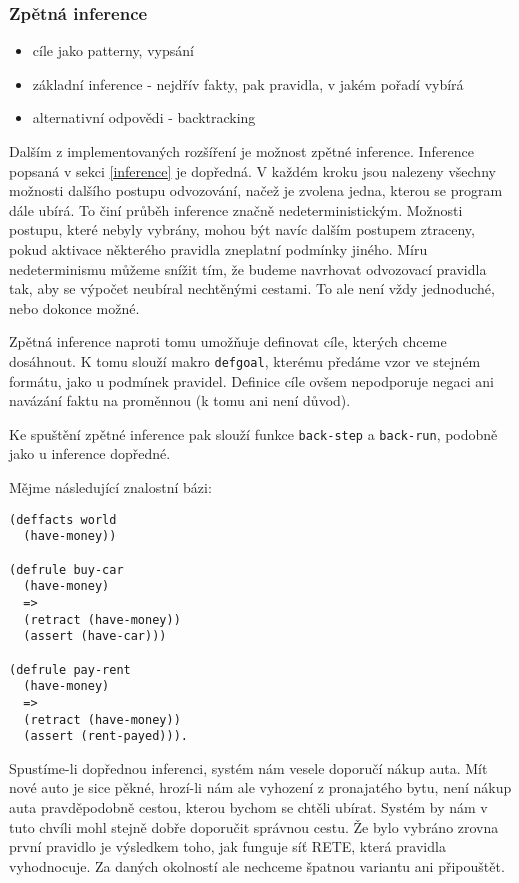 \subsubsection{Zpětná inference}
\begin{framed}
  \begin{itemize}
    \item cíle jako patterny, vypsání
    \item základní inference - nejdřív fakty, pak pravidla, v jakém pořadí
      vybírá
    \item alternativní odpovědi - backtracking
  \end{itemize}
\end{framed}

Dalším z implementovaných rozšíření je možnost zpětné inference. Inference
popsaná v sekci \ref{inference} je dopředná. V každém kroku jsou nalezeny
všechny možnosti dalšího postupu odvozování, načež je zvolena jedna, kterou se
program dále ubírá. To činí průběh inference značně nedeterministickým. Možnosti
postupu, které nebyly vybrány, mohou být navíc dalším postupem ztraceny, pokud
aktivace některého pravidla zneplatní podmínky jiného.
Míru nedeterminismu můžeme snížit tím, že budeme navrhovat odvozovací pravidla
tak, aby se výpočet neubíral nechtěnými cestami. To ale není vždy jednoduché,
nebo dokonce možné.

Zpětná inference naproti tomu umožňuje definovat cíle, kterých chceme dosáhnout.
K tomu slouží makro \verb|defgoal|, kterému předáme vzor ve stejném formátu,
jako u podmínek pravidel. Definice cíle ovšem nepodporuje negaci ani navázání
faktu na proměnnou (k tomu ani není důvod).

Ke spuštění zpětné inference pak slouží funkce \verb|back-step| a
\verb|back-run|, podobně jako u inference dopředné.

Mějme následující znalostní bázi:
\begin{verbatim}
(deffacts world
  (have-money))

(defrule buy-car
  (have-money)
  =>
  (retract (have-money))
  (assert (have-car)))

(defrule pay-rent
  (have-money)
  =>
  (retract (have-money))
  (assert (rent-payed))).
\end{verbatim}
Spustíme-li dopřednou inferenci, systém nám vesele doporučí nákup auta.
Mít nové auto je sice pěkné, hrozí-li nám ale vyhození z pronajatého bytu,
není nákup auta pravděpodobně cestou, kterou bychom se chtěli ubírat.
Systém by nám v tuto chvíli mohl stejně dobře doporučit správnou cestu. Že bylo
vybráno zrovna první pravidlo je výsledkem toho, jak funguje síť RETE, která
pravidla vyhodnocuje. Za daných okolností ale nechceme špatnou variantu ani
připouštět.

